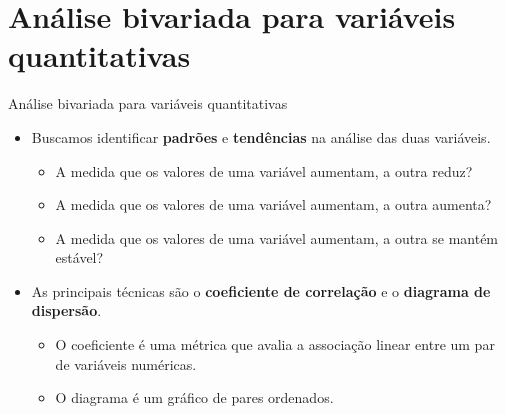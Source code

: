\documentclass[
  ignorenonframetext,
  serif,
  professionalfont,
  usenames,
  dvipsnames,
  aspectratio = 169]{beamer}
\providecommand{\tightlist}{%
  \setlength{\itemsep}{0pt}\setlength{\parskip}{0pt}}
\renewcommand{\tightlist}{%
  \setlength{\itemsep}{0\baselineskip}
  \setlength{\parskip}{0.25\baselineskip}
}
\def\beginAHalfColumn{\begin{minipage}{0.49\textwidth}}%
\def\endColumns{\end{minipage}}%
\begin{document}
\section{Análise bivariada para variáveis
quantitativas}\label{anuxe1lise-bivariada-para-variuxe1veis-quantitativas}

\begin{frame}{Análise bivariada para variáveis quantitativas}
\label{anuxe1lise-bivariada-para-variuxe1veis-quantitativas-1}
\beginAHalfColumn

\begin{itemize}
\tightlist
\item
  Buscamos identificar \textbf{padrões} e \textbf{tendências} na análise
  das duas variáveis.

  \begin{itemize}
  \tightlist
  \item
    A medida que os valores de uma variável aumentam, a outra reduz?
  \item
    A medida que os valores de uma variável aumentam, a outra aumenta?
  \item
    A medida que os valores de uma variável aumentam, a outra se mantém
    estável?
  \end{itemize}
\end{itemize}

\endColumns
\beginAHalfColumn

\begin{itemize}
\tightlist
\item
  As principais técnicas são o \textbf{coeficiente de correlação} e o
  \textbf{diagrama de dispersão}.

  \begin{itemize}
  \tightlist
  \item
    O coeficiente é uma métrica que avalia a associação linear entre um
    par de variáveis numéricas.
  \item
    O diagrama é um gráfico de pares ordenados.
  \end{itemize}
\end{itemize}

\endColumns
\end{frame}
\end{document}
